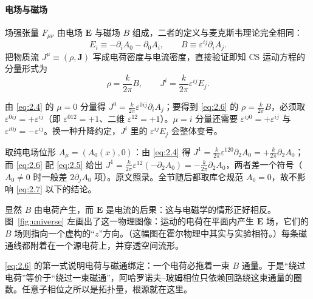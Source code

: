 \paragraph{电场与磁场} %
场强张量 $F_{\mu\nu}$ 由电场 $\mathbf{E}$ 与磁场 $B$ 组成，二者的定义与麦克斯韦理论完全相同：
\begin{equation}\tag{2.5}\label{eq:2.5}
  E_i \equiv -\partial_i A_0 - \partial_0 A_i, \qquad B \equiv \varepsilon^{ij}\partial_i A_j .
\end{equation}
把物质流 $J^\mu\equiv(\rho,\mathbf{J})$ 写成电荷密度与电流密度，直接验证即知 CS 运动方程的分量形式为
\begin{equation}\tag{2.6}\label{eq:2.6}
  \rho = \frac{k}{2\pi}B, \qquad J^i = \frac{k}{2\pi}\varepsilon^{ij}E_j .
\end{equation}

\begin{yizhu}[易错点]
由 \eqref{eq:2.4} 的 $\mu=0$ 分量得 $J^0=\frac{k}{2\pi}\varepsilon^{0ij}\partial_iA_j$；要得到 \eqref{eq:2.6} 的 $\rho=\frac{k}{2\pi}B$，必须取 $\varepsilon^{0ij}=+\varepsilon^{ij}$（即 $\varepsilon^{012}=+1$、二维 $\varepsilon^{12}=+1$）。$\mu=i$ 分量还需要 $\varepsilon^{ij0}=+\varepsilon^{ij}$ 与 $\varepsilon^{i0j}=-\varepsilon^{ij}$。换一种升降约定，$J^i$ 里的 $\varepsilon^{ij}E_j$ 会整体变号。
\end{yizhu}

\begin{yizhu}[原文疑误]
取纯电场位形 $A_\mu=(A_0(x),0)$：由 \eqref{eq:2.4} 得 $J^1=\frac{k}{2\pi}\varepsilon^{120}\partial_2A_0=+\frac{k}{2\pi}\partial_2A_0$；而 \eqref{eq:2.6} 配 \eqref{eq:2.5} 给出 $J^1=\frac{k}{2\pi}\varepsilon^{12}(-\partial_2A_0)=-\frac{k}{2\pi}\partial_2A_0$，两者差一个符号（$A_0\neq0$ 时一般差 $2\partial_jA_0$ 项）。原文照录。全节随后都取库仑规范 $A_0=0$，故不影响 \eqref{eq:2.7} 以下的结论。
\end{yizhu}

显然 $B$ 由电荷产生，而 $\mathbf{E}$ 是电流的后果：这与电磁学的情形正好相反。图~\ref{fig:universe} 左画出了这一物理图像：运动的电荷在平面内产生 $\mathbf{E}$ 场，它们的 $B$ 场则指向一个虚构的“$z$”方向。（这幅图在霍尔物理中其实与实验相符。）每条磁通线都附着在一个源电荷上，并穿透空间流形。

\begin{yizhu}[物理图像]
\eqref{eq:2.6} 的第一式说明电荷与磁通绑定：一个电荷必拖着一束 $B$ 通量。于是“绕过电荷”等价于“绕过一束磁通”，阿哈罗诺夫–玻姆相位只依赖回路绕这束通量的圈数。任意子相位之所以是拓扑量，根源就在这里。
\end{yizhu}

